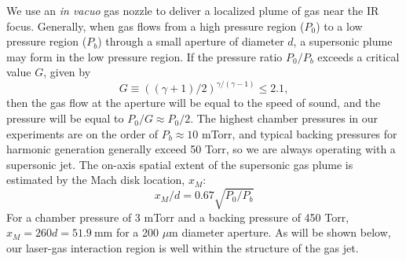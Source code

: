 We use an \textit{in vacuo} gas nozzle to deliver a localized plume of gas near the IR focus. Generally, when gas flows from a high pressure region ($P_0$) to a low pressure region ($P_b$) through a small aperture of diameter $d$, a supersonic plume may form in the low pressure region. If the pressure ratio $P_0/P_b$ exceeds a critical value $G$, given by
\begin{equation}
G \equiv ((\gamma+1)/2)^{\gamma/(\gamma-1)} \le 2.1,
\label{eqn:G_factor}
\end{equation}
then the gas flow at the aperture will be equal to the speed of sound, and the pressure will be equal to $P_0 / G \approx P_0/2$. The highest chamber pressures in our experiments are on the order of $P_b \approx 10$ mTorr, and typical backing pressures for harmonic generation generally exceed 50 Torr, so we are always operating with a supersonic jet. The on-axis spatial extent of the supersonic gas plume is estimated by the Mach disk location, $x_M$:
\begin{equation}
x_M / d = 0.67 \sqrt{P_0/P_b}
\label{eqn:Mach-disk}
\end{equation}
For a chamber pressure of 3 mTorr and a backing pressure of 450 Torr, ${x_M = 260d = 51.9 \ \textrm{mm}}$ for a 200 $\mu$m diameter aperture. As will be shown below, our laser-gas interaction region is well within the structure of the gas jet.

